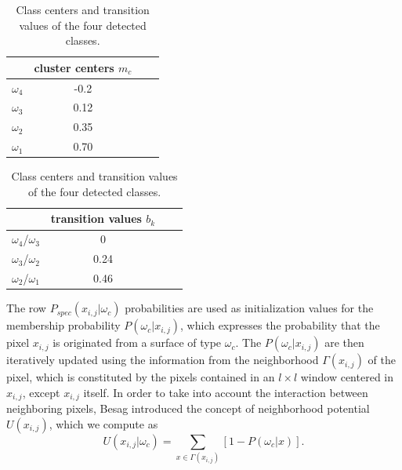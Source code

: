 \documentclass[a4paper, 10pt, conference]{ieeeconf}      %
\begin{document}
\begin{table}[t]
		\centering
	\begin{subtable}[t]{0.21\textwidth}
		\centering
		\begin{tabular}{ | c| c | c | p{5cm} |} 
    		\hline
    		\; & cluster centers $m_c$  \\ \hline
    		$\omega_4$ & -0.2 \\  \hline
    		$\omega_3$ &  0.12  \\ \hline
    		$\omega_2$ &  0.35  \\ \hline
    		$\omega_1$ &   0.70\\
   		\hline
    \end{tabular}
    \caption{} 
    \label{table_cluster}
    \end{subtable}
%
 	\begin{subtable}[t]{0.24\textwidth}
\centering
    		\vspace{-9mm}
   		\begin{tabular}{ | c| c | c | p{5cm} |} 
    		\hline
     		& transition values $b_k$\\ \hline
    		$\omega_4$/$\omega_3$ & 0  \\  \hline
    		$\omega_3$/$\omega_2$ &  0.24 \\ \hline
    		$\omega_2$/$\omega_1$ &  0.46  \\ \hline
    		\end{tabular}
    		\vspace{3mm}
		\caption{} 
		\label{table_transition}
	\end{subtable}
			\caption{Class centers and transition values of the four detected classes.} 
\end{table}

The row $P_{spec}(x_{i,j}|\omega_c)$ probabilities are used as initialization values for the membership probability $P(\omega_c | x_{i,j})$, which expresses the probability that the pixel $x_{i,j}$ is originated from a surface of type $\omega_c$.
The $P(\omega_c | x_{i,j})$ are then iteratively updated using the information from the neighborhood  $\Gamma (x_{i,j})$ of the pixel, which is constituted by the pixels contained in an $l\times l $  window centered in $x_{i,j}$, except $x_{i,j}$ itself. 
In order to take into account the interaction between neighboring pixels, Besag \cite{1986_besag} introduced the concept of  neighborhood potential $U(x_{i,j})$, which we compute as
%
\begin{equation} \label{U}
U(x_{i,j}|\omega_c) =   \sum_{x\in \Gamma (x_{i,j}) } [1-P(\omega_c|x)].
\end{equation}
\end{document}
